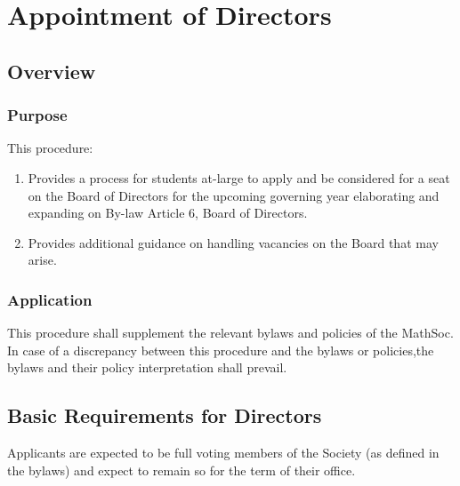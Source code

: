 \section{Appointment of Directors}
\subsection{Overview}
\subsubsection{Purpose}
This procedure:
\begin{enumerate}
    \item Provides a process for students at-large to apply and be considered for a seat on the 
        Board of Directors for the upcoming governing year elaborating and expanding on By-law Article 6, 
        Board of Directors.
    \item Provides additional guidance on handling vacancies on the Board that may arise. 
\end{enumerate}

\subsubsection{Application}
This procedure shall supplement the relevant bylaws and policies of the MathSoc. 
In case of a discrepancy between this procedure and the bylaws or policies,the bylaws and their policy interpretation shall prevail.

\subsection{Basic Requirements for Directors}
Applicants are expected to be full voting members of the Society (as defined in the bylaws) and expect to remain so for the term of their office.

